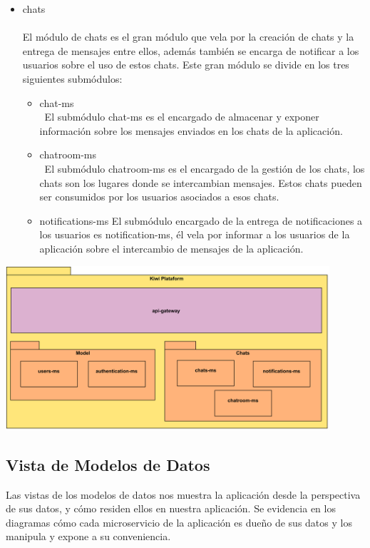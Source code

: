 \begin{itemize}
    \item chats \\\\
    El módulo de chats es el gran módulo que vela por la creación de chats y la entrega de mensajes entre ellos, además también se encarga de notificar a los usuarios sobre el uso de estos chats. Este gran módulo se divide en los tres siguientes submódulos:
    \begin{itemize}
        \item chat-ms\\\
        El submódulo chat-ms es el encargado de almacenar y exponer información sobre los mensajes enviados en los chats de la aplicación.
        \item chatroom-ms\\\
        El submódulo chatroom-ms es el encargado de la gestión de los chats, los chats son los lugares donde se intercambian mensajes. Estos chats pueden ser consumidos por los usuarios asociados a esos chats.
        \item notifications-ms
        El submódulo encargado de la entrega de notificaciones a los usuarios es notification-ms, él vela por informar a los usuarios de la aplicación sobre el intercambio de mensajes de la aplicación.
    \end{itemize}
\end{itemize}

\begin{center}
    \includegraphics[width=12cm]{Figures/P3/decomposition.png}  
\end{center}

\subsection{Vista de Modelos de Datos}
Las vistas de los modelos de datos nos muestra la aplicación desde la perspectiva de sus datos, y cómo residen ellos en nuestra aplicación. Se evidencia en los diagramas cómo cada microservicio de la aplicación es dueño de sus datos y los manipula y expone a su conveniencia.
